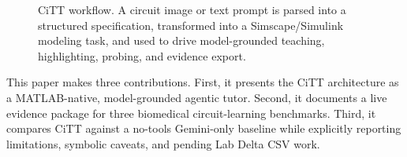 \begin{figure}[t]
\centering
{}
\caption{CiTT workflow. A circuit image or text prompt is parsed into a structured specification, transformed into a Simscape/Simulink modeling task, and used to drive model-grounded teaching, highlighting, probing, and evidence export.}
\label{fig:workflow}
\end{figure}

This paper makes three contributions. First, it presents the CiTT architecture as a MATLAB-native, model-grounded agentic tutor. Second, it documents a live evidence package for three biomedical circuit-learning benchmarks. Third, it compares CiTT against a no-tools Gemini-only baseline while explicitly reporting limitations, symbolic caveats, and pending Lab Delta CSV work.
